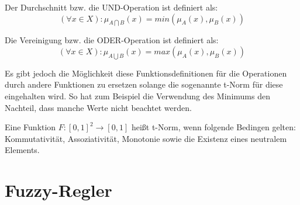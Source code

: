 \documentclass[12pt,a4paper,bibliography=totocnumbered,listof=totocnumbered, abstracton]{scrartcl}
\theoremstyle{Umgebung}
\begin{document}
\begin{defnt}[Durchschnitt]
	Der Durchschnitt bzw. die UND-Operation ist definiert als: 
	\begin{equation}
		(\forall x \in X) : \mu_{A \bigcap B}( x) = min(\mu_A(x),\mu_B(x))
	\end{equation}
\end{defnt}

\begin{defnt}[Vereinigung]
	Die Vereinigung bzw. die ODER-Operation ist definiert als: 
	\begin{equation}
		(\forall x \in X) : \mu_{A \bigcup B}( x) = max(\mu_A(x),\mu_B(x))
	\end{equation}	  
\end{defnt}

Es gibt jedoch die Möglichkeit diese Funktionsdefinitionen für die Operationen durch andere Funktionen zu ersetzen solange die sogenannte t-Norm für diese eingehalten wird. So hat zum Beispiel die Verwendung des Minimums den Nachteil, dass manche Werte nicht beachtet werden.

\begin{defnt}
	Eine Funktion $F: \left[0,1\right]^2 \rightarrow \left[0,1\right]$ heißt t-Norm, wenn folgende Bedingen gelten: Kommutativität, Assoziativität, Monotonie sowie die Existenz eines neutralem Elements.
	
\end{defnt}

\section{Fuzzy-Regler}
\end{document}
